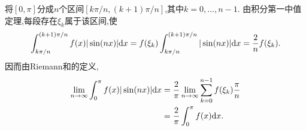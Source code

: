 \documentclass{ctexart}
\begin{document}
\begin{solution}
将$[0,\pi]$分成$n$个区间$[k\pi/n,(k+1)\pi/n]$,其中$k=0,\ldots,n-1$.
    由积分第一中值定理,每段存在$\xi_k$属于该区间,使
    \[\int_{k\pi/n}^{(k+1)\pi/n}f(x)|\sin(nx)|\mathrm{d} x
      =f(\xi_k)\int_{k\pi/n}^{(k+1)\pi/n}|\sin(nx)|\mathrm{d} x=\dfrac2n f(\xi_k).\]
    因而由Riemann和的定义,
    \[\begin{aligned}
      \lim_{n\to\infty}\int_0^\pi f(x)|\sin(nx)|\mathrm{d} x
      &=\dfrac2\pi\lim_{n\to\infty}\sum_{k=0}^{n-1}f(\xi_k)\dfrac\pi n\\
      &=\dfrac2\pi\int_0^\pi f(x)\mathrm{d} x.
    \end{aligned}\]
\end{solution}
\end{document}
